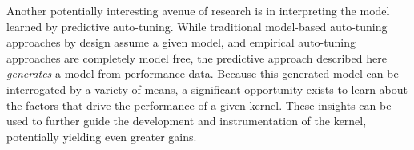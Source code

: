 \documentclass{sig-alternate}
\begin{document}
Another potentially interesting avenue of research is in interpreting the model
learned by predictive auto-tuning.  While traditional model-based auto-tuning
approaches by design assume a given model, and empirical auto-tuning approaches
are completely model free, the predictive approach described here
\emph{generates} a model from performance data.  Because this generated model
can be interrogated by a variety of means, a significant opportunity exists to
learn about the factors that drive the performance of a given kernel.  These
insights can be used to further guide the development and instrumentation of
the kernel, potentially yielding even greater gains.



% 
% 



{\small
    
}
\end{document}
